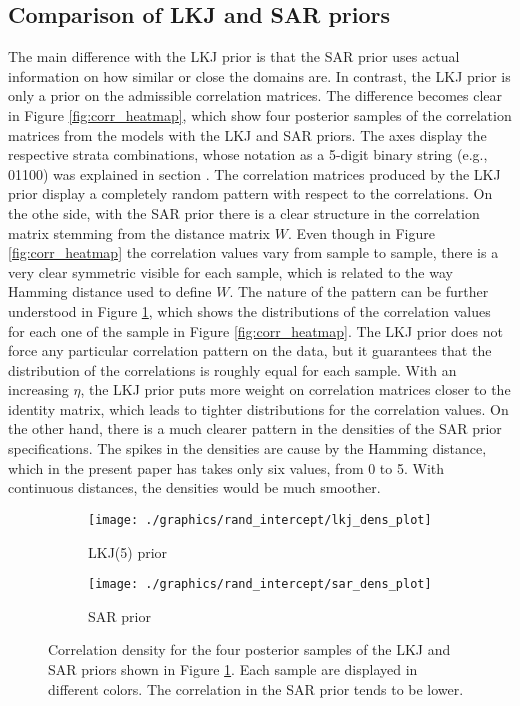 \subsection{Comparison of LKJ and SAR priors}
The main difference with the LKJ prior is that the SAR prior uses actual information on how similar or close the domains are.
In contrast, the LKJ prior is only a prior on the admissible correlation matrices.
The difference becomes clear in Figure \ref{fig:corr_heatmap}, which show four posterior samples of the correlation matrices from the models with the LKJ and SAR priors.
The axes display the respective strata combinations, whose notation as a 5-digit binary string (e.g., 01100) was explained in section .
The correlation matrices produced by the LKJ prior display a completely random pattern with respect to the correlations.
On the othe side, with the SAR prior there is a clear structure in the correlation matrix stemming from the distance matrix $W$.
Even though in Figure \ref{fig:corr_heatmap} the correlation values vary from sample to sample, there is a very clear symmetric visible for each sample, which is related to the way Hamming distance used to define $W$.
The nature of the pattern can be further understood in Figure \ref{fig:corr_density}, which shows the distributions of the correlation values for each one of the sample in Figure \ref{fig:corr_heatmap}.
The LKJ prior does not force any particular correlation pattern on the data, but it guarantees that the distribution of the correlations is roughly equal for each sample.
With an increasing $\eta$, the LKJ prior puts more weight on correlation matrices closer to the identity matrix, which leads to tighter distributions for the correlation values.
On the other hand, there is a much clearer pattern in the densities of the SAR prior specifications.
The spikes in the densities are cause by the Hamming distance, which in the present paper has takes only six values, from 0 to 5.
With continuous distances, the densities would be much smoother.

\begin{figure}
    \begin{subfigure}{0.49\linewidth}
        \texttt{[image: ./graphics/rand\_intercept/lkj\_dens\_plot]}
        \caption{LKJ(5) prior}
    \end{subfigure}
    \begin{subfigure}{0.49\linewidth}
        \texttt{[image: ./graphics/rand\_intercept/sar\_dens\_plot]}
        \caption{SAR prior}
    \end{subfigure}
    \caption[Correlation density for the LKJ and SAR priors]{Correlation density for the four posterior samples of the LKJ and SAR priors shown in Figure \ref{fig:corr_density}. Each sample are displayed in different colors. The correlation in the SAR prior tends to be lower.}
    \label{fig:corr_density}
\end{figure}



